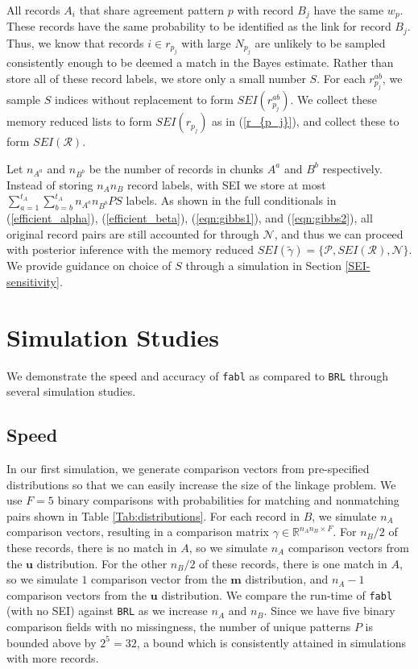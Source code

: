 \documentclass[ba]{imsart}
\begin{document}
All records $A_i$ that share agreement pattern $p$ with record $B_j$ have the same $w_{p}$. These records have the same probability to be identified as the link for record $B_j$. Thus, we know that records $i \in r_{p_j}$ with large $N_{p_j}$ are unlikely to be sampled consistently enough to be deemed a match in the Bayes estimate. Rather than store all of these record labels, we store only a small number $S$. For each $r_{p_j}^{ab}$, we sample $S$ indices without replacement to form $SEI(r_{p_j}^{ab})$. We collect these memory reduced lists to form $SEI(r_{p_j})$ as in (\ref{r_{p_j}}), and collect these to form $SEI(\mathcal{R})$.

Let $n_{A^a}$ and $n_{B^b}$ be the number of records in chunks $A^a$ and $B^b$ respectively. Instead of storing $n_A n_B$ record labels, with SEI we store at most $\sum_{a = 1}^{t_A}\sum_{b = b}^{t_A} n_{A^a}  n_{B^b}  P  S$ labels. As shown in the full conditionals in (\ref{efficient_alpha}),  (\ref{efficient_beta}), (\ref{eqn:gibbs1}), and (\ref{eqn:gibbs2}), all original record pairs are still accounted for through $\mathcal{N}$, and thus we can proceed with posterior inference with the memory reduced $SEI(\tilde{\gamma}) = \{\mathcal{P}, SEI(\mathcal{R}), \mathcal{N}\}$. We provide guidance on choice of $S$ through a simulation in Section \ref{SEI-sensitivity}.

	\section{Simulation Studies}
	\label{sec:simulations}
	
	We demonstrate the speed and accuracy of \texttt{fabl} as compared to \texttt{BRL} through several simulation studies. 
	
	\hypertarget{speed}{%
		\subsection{Speed}\label{speed}}
	
	In our first simulation, we generate comparison vectors from pre-specified distributions so that we can easily increase the size of the linkage problem. We use $F = 5$ binary comparisons with probabilities for matching and nonmatching pairs shown in Table \ref{Tab:distributions}. For each record in $B$, we simulate $n_A$ comparison vectors, resulting in a comparison matrix $\gamma \in \mathbb{R}^{n_A n_B \times F}$. For $n_B/2$ of these records, there is no match in $A$, so we simulate $n_A$ comparison vectors from the $\bm{u}$ distribution. For the other $n_B/2$ of these records, there is one match in $A$, so we simulate $1$ comparison vector from the $\bm{m}$ distribution, and $n_A - 1$ comparison vectors from the $\bm{u}$ distribution. We compare the run-time of \texttt{fabl} (with no SEI) against \texttt{BRL} as we increase $n_A$ and $n_B$. Since we have five binary comparison fields with no missingness, the number of unique patterns $P$ is bounded above by $2^5 = 32$, a bound which is consistently attained in simulations with more records.
	
\end{document}
